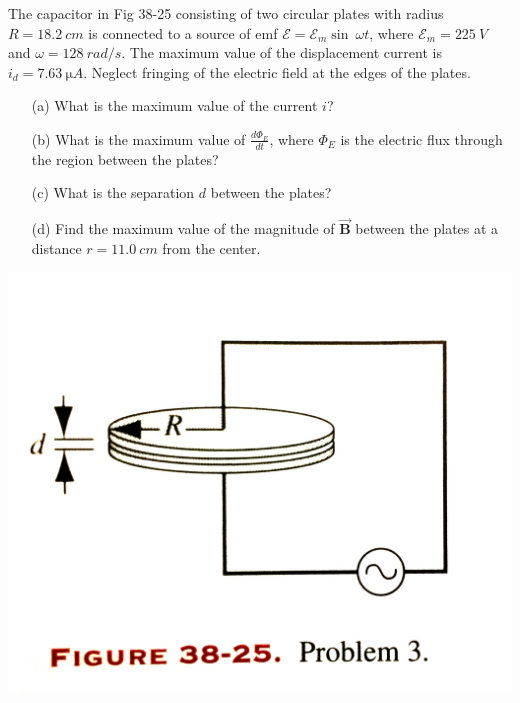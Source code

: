 \documentclass[12pt,letterpaper,boxed,cm]{hmcpset}
\newcommand{\f}[2]{\frac{#1}{#2}}
\begin{document}
\begin{problem}[38-P3]
The capacitor in Fig 38-25 consisting of two circular plates with radius $R = \SI{18.2}{cm}$ is connected to a source of emf $\mathscr{E} = \mathscr{E}_m\sin~\omega t$, where $\mathscr{E}_m = \SI{225}{V}$ and $\omega = \SI{128}{rad/s}$. The maximum value of the displacement current is $i_d = \SI{7.63}{\micro A}$. Neglect fringing of the electric field at the edges of the plates.
\begin{enumerate}
	\item[(a)] What is the maximum value of the current $i$?
	\item[(b)] What is the maximum value of $\f{d\Phi_E}{dt}$, where $\Phi_E$ is the electric flux through the region between the plates?
	\item[(c)] What is the separation $d$ between the plates?
	\item[(d)] Find the maximum value of the magnitude of $\vec{\mathbf{B}}$ between the plates at a distance $r = \SI{11.0}{cm}$ from the center.
\end{enumerate}
\begin{center}
	\includegraphics[scale=0.1]{01.jpg}
\end{center}
\end{problem}
\begin{solution}
\end{solution}
\newpage
\end{document}
